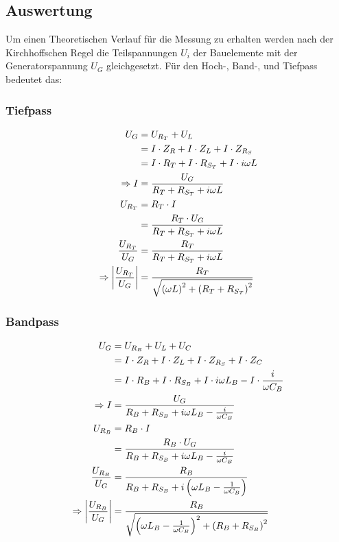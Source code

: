 \subsection{Auswertung}
Um einen Theoretischen Verlauf für die Messung zu erhalten werden nach der {\sc Kirchhoffschen Regel} die Teilspannungen \(U_i\) der Bauelemente mit der Generatorspannung \(U_G\) gleichgesetzt. Für den Hoch-, Band-, und Tiefpass bedeutet das:
\subsubsection{Tiefpass}
\begin{align}
U_G &= U_{R_T} + U_L\notag\\
&= I \cdot Z_R + I \cdot Z_L + I \cdot Z_{R_S}\notag\\
&= I \cdot R_T + I \cdot  R_{S_T} + I \cdot i \omega L\notag\\
\Rightarrow I &= \frac{U_G}{R_T + R_{S_T} + i \omega L}\notag\\
U_{R_T} &= R_T \cdot I\notag\\
&= \frac{R_T \cdot U_G}{R_T + R_{S_T} + i \omega L}\notag\\
\frac{U_{R_T}}{U_G} &= \frac{R_T}{R_T + R_{S_T} + i \omega L}\notag\\
\Rightarrow \bigg\vert \frac{U_{R_T}}{U_G} \bigg\vert &= \frac{R_T}{\sqrt{
\left(\omega L\right)^2 +
\left(R_T + R_{S_T}\right)^2
}} \label{tiefpass}
\end{align}
\subsubsection{Bandpass}
\begin{align}
U_G &= U_{R_B} + U_L + U_C\notag\\
&= I \cdot Z_R + I \cdot Z_L + I \cdot Z_{R_S} + I \cdot Z_C\notag\\
&= I \cdot R_B + I \cdot  R_{S_B} + I \cdot i \omega L_B - I \cdot \frac{i}{\omega C_B} \notag\\
\Rightarrow I &= \frac{U_G}{R_B + R_{S_B} + i \omega L_B - \frac{i}{\omega C_B}}\notag\\
U_{R_B} &= R_B \cdot I\notag\\
&= \frac{R_B \cdot U_G}{R_B + R_{S_B} + i \omega L_B - \frac{i}{\omega C_B}}\notag\\
\frac{U_{R_B}}{U_G} &= \frac{R_B}{R_B + R_{S_B} + i \left( \omega L_B - \frac{1}{\omega C_B}\right)}\notag\\
\Rightarrow \bigg\vert \frac{U_{R_B}}{U_G} \bigg\vert &= \frac{R_B}{\sqrt{
\left(\omega L_B - \frac{1}{\omega C_B} \right)^2 +
\left(R_B + R_{S_B}\right)^2
}} \label{bandpass}
\end{align}
